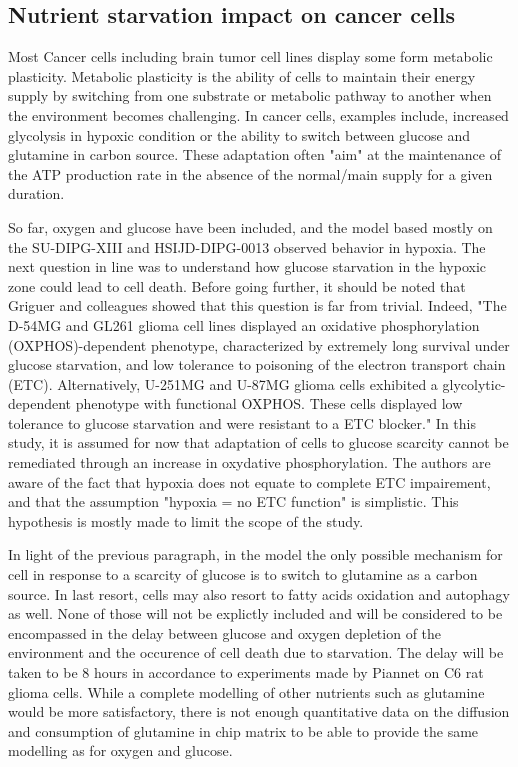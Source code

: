 \documentclass[11pt,a4paper]{article}
\begin{document}
\subsection{Nutrient starvation impact on cancer cells}
Most Cancer cells including brain tumor cell lines display some form metabolic plasticity. Metabolic plasticity is the ability of cells to maintain their energy supply by switching from one substrate or metabolic pathway to another when the environment becomes challenging.\cite{Venneti2016}\cite{DeBerardinis2008}\cite{Spinelli2018} In cancer cells, examples include, increased glycolysis in hypoxic condition or the ability to switch between glucose and glutamine in carbon source.\cite{Waker2018}\cite{Natarajan2019} These adaptation often "aim" at the maintenance of the ATP production rate in the absence of the normal/main supply for a given duration.\cite{Piannet1991}

So far, oxygen and glucose have been included, and the model based mostly on the SU-DIPG-XIII and HSIJD-DIPG-0013 observed behavior in hypoxia. The next question in line was to understand how glucose starvation in the hypoxic zone could lead to cell death. Before going further, it should be noted  that Griguer and colleagues showed that this question is far from trivial. Indeed, "The D-54MG and GL261 glioma cell lines displayed an oxidative phosphorylation (OXPHOS)-dependent phenotype, characterized by extremely long survival under glucose starvation, and low tolerance to poisoning of the electron transport chain (ETC). Alternatively, U-251MG and U-87MG glioma cells exhibited a glycolytic-dependent phenotype with functional OXPHOS. These cells displayed low tolerance to glucose starvation and were resistant to a ETC blocker."\cite {Griguer2005} In this study, it is assumed for now that adaptation of cells to glucose scarcity cannot be remediated through an increase in oxydative phosphorylation. The authors are aware of the fact that hypoxia does not equate to complete ETC impairement, and that the assumption "hypoxia = no ETC function" is simplistic.  This hypothesis is mostly made to limit the scope of the study. 

In light of the previous paragraph, in the model the only possible mechanism for cell in response to a scarcity of glucose is to switch to glutamine as a carbon source. In last resort, cells may also resort to fatty acids oxidation and autophagy as well. None of those will not be explictly  included and will be considered to be encompassed in the delay between glucose and oxygen depletion of the environment and the occurence of cell death due to starvation. The delay will be taken to be 8 hours in accordance to experiments made by Piannet on C6 rat glioma cells.\cite{Piannet1991} While a complete modelling of other nutrients such as glutamine would be more satisfactory, there is not enough quantitative data on the diffusion and consumption of glutamine in chip matrix to be able to provide the same modelling as for oxygen and glucose.
\end{document}
